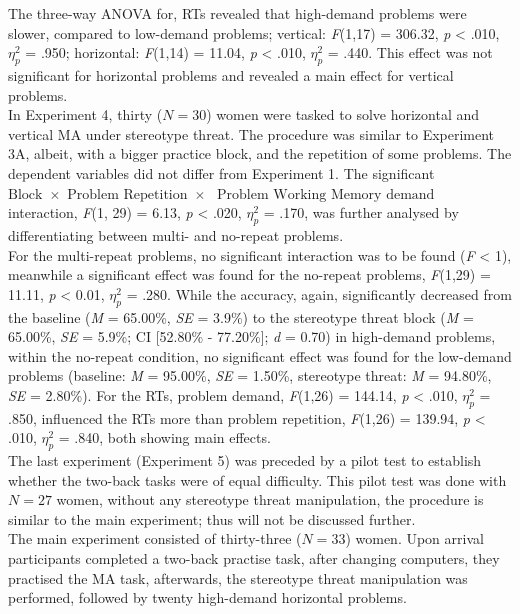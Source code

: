 \documentclass[
  stu,floatsintext]{apa7}
\begin{document}
The three-way ANOVA for, RTs revealed that high-demand problems were slower, compared to low-demand problems; vertical: \emph{F}(1,17) = 306.32, \emph{p} \textless{} .010, \(\eta^{2}_{p}\) = .950; horizontal: \emph{F}(1,14) = 11.04, \emph{p} \textless{} .010, \(\eta^{2}_{p}\) = .440.
This effect was not significant for horizontal problems and revealed a main effect for vertical problems.\\
In Experiment 4, thirty (\(N = 30\)) women were tasked to solve horizontal and vertical MA under stereotype threat.
The procedure was similar to Experiment 3A, albeit, with a bigger practice block, and the repetition of some problems.
The dependent variables did not differ from Experiment 1.
The significant \(\text{Block } \times \text{ Problem Repetition } \times\) \(\text{ Problem Working Memory demand }\) interaction, \emph{F}(1, 29) = 6.13, \emph{p} \textless{} .020, \(\eta^{2}_{p}\) = .170, was further analysed by differentiating between multi- and no-repeat problems.\\
For the multi-repeat problems, no significant interaction was to be found (\emph{F} \textless{} 1), meanwhile a significant effect was found for the no-repeat problems, \emph{F}(1,29) = 11.11, \emph{p} \textless{} 0.01, \(\eta^{2}_{p}\) = .280.
While the accuracy, again, significantly decreased from the baseline (\emph{M} = 65.00\%, \emph{SE} = 3.9\%) to the stereotype threat block (\emph{M} = 65.00\%, \emph{SE} = 5.9\%; CI {[}52.80\% - 77.20\%{]}; \emph{d} = 0.70) in high-demand problems, within the no-repeat condition, no significant effect was found for the low-demand problems (baseline: \emph{M} = 95.00\%, \emph{SE} = 1.50\%, stereotype threat: \emph{M} = 94.80\%, \emph{SE} = 2.80\%).
For the RTs, problem demand, \emph{F}(1,26) = 144.14, \emph{p} \textless{} .010, \(\eta^{2}_{p}\) = .850, influenced the RTs more than problem repetition, \emph{F}(1,26) = 139.94, \emph{p} \textless{} .010, \(\eta^{2}_{p}\) = .840, both showing main effects.\\
The last experiment (Experiment 5) was preceded by a pilot test to establish whether the two-back tasks were of equal difficulty.
This pilot test was done with \(N = 27\) women, without any stereotype threat manipulation, the procedure is similar to the main experiment; thus will not be discussed further.\\
The main experiment consisted of thirty-three (\(N = 33\)) women.
Upon arrival participants completed a two-back practise task, after changing computers, they practised the MA task, afterwards, the stereotype threat manipulation was performed, followed by twenty high-demand horizontal problems.
\end{document}
